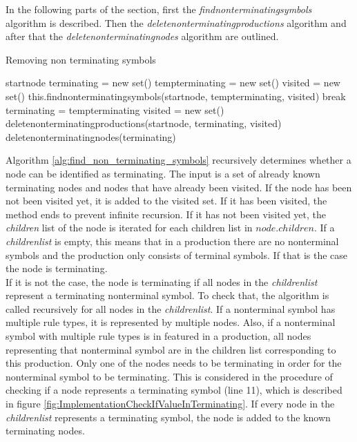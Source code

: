 In the following parts of the section, first the \textit{find\textunderscore non\textunderscore terminating\textunderscore symbols} algorithm is described. Then the \textit{delete\textunderscore non\textunderscore terminating\textunderscore productions} algorithm and after that the \textit{delete\textunderscore non\textunderscore terminating\textunderscore nodes} algorithm are outlined.

\begin{algorithm}[H]
\caption{Removing non terminating symbols}
\begin{algorithmic}[1] 
\Require start\textunderscore node
\State terminating = new set()
\State temp\textunderscore terminating = new set()
	\State visited = new set()
	\State this.find\textunderscore non\textunderscore terminating\textunderscore symbols(start\textunderscore node, temp\textunderscore terminating, visited)
		\State break
	\Else
		\State terminating = temp\textunderscore terminating
	\EndIf
\EndWhile
\State visited = new set() 
\State delete\textunderscore non\textunderscore terminating\textunderscore productions(start\textunderscore node, terminating, visited)
\State delete\textunderscore non\textunderscore terminating\textunderscore nodes(terminating)
\end{algorithmic}
\label{alg:remove_non_terminating_symbols}
\end{algorithm}

Algorithm \ref{alg:find_non_terminating_symbols}  recursively determines whether a node can be identified as terminating.
The input is a set of already known terminating nodes and nodes that have already been visited.
If the node has been not been visited yet, it is added to the visited set.
If it has been visited, the method ends to prevent infinite recursion.
If it has not been visited yet, the \textit{children} list of the node is iterated for each children list in $node.children$.
If a \textit{children\textunderscore list} is empty, this means that in a production there are no nonterminal symbols and the production only consists of terminal symbols. If that is the case the node is terminating.\\
If it is not the case, the node is terminating if all nodes in the \textit{children\textunderscore list} represent a terminating nonterminal symbol.
To check that, the algorithm is called recursively for all nodes in the \textit{children\textunderscore list}.
If a nonterminal symbol has multiple rule types, it is represented by multiple nodes. Also, if a nonterminal symbol with multiple rule types is in featured in a production, all nodes representing that nonterminal symbol are in the children list corresponding to this production. Only one of the nodes needs to be terminating in order for the nonterminal symbol to be terminating.
This is considered in the procedure of checking if a node represents a terminating symbol (line 11), which is described in figure \ref{fig:ImplementationCheckIfValueInTerminating}.
If every node in the \textit{children\textunderscore list} represents a terminating symbol, the node is added to the known terminating nodes.

